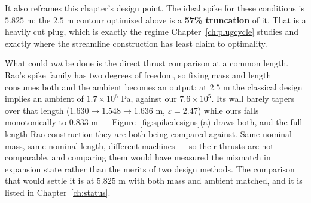 It also reframes this chapter's design point. The ideal spike for
these conditions is $5.825$ m; the $2.5$ m contour optimized above is
a \textbf{57\% truncation} of it. That is a heavily cut plug, which is
exactly the regime Chapter~\ref{ch:plugcycle} studies and exactly
where the streamline construction has least claim to optimality.

What could \emph{not} be done is the direct thrust comparison at a
common length. Rao's spike family has two degrees of freedom, so
fixing mass and length consumes both and the ambient becomes an
output: at $2.5$ m the classical design implies an ambient of
$1.7\times10^{6}$ Pa, against our $7.6\times10^{5}$. Its wall barely
tapers over that length ($1.630 \to 1.548 \to 1.636$ m, $\varepsilon =
2.47$) while ours falls monotonically to $0.833$ m ---
Figure~\ref{fig:spikedesigns}(a) draws both, and the full-length Rao
construction they are both being compared against. Same nominal mass,
same nominal length, different machines --- so their thrusts are not
comparable, and comparing them would have measured the mismatch in
expansion state rather than the merits of two design methods. The
comparison that would settle it is at $5.825$ m with both mass and
ambient matched, and it is listed in Chapter~\ref{ch:status}.

